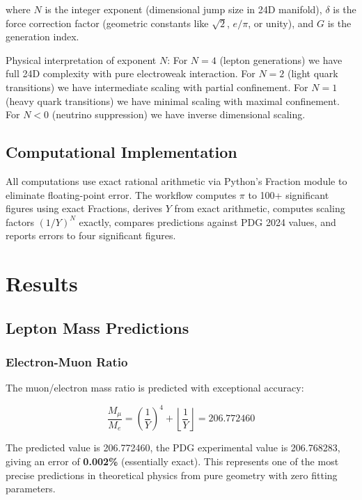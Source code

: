 \documentclass[11pt]{article}
\begin{document}
where $N$ is the integer exponent (dimensional jump size in 24D manifold), $\delta$ is the force correction factor (geometric constants like $\sqrt{2}$, $e/\pi$, or unity), and $G$ is the generation index.

Physical interpretation of exponent $N$: For $N = 4$ (lepton generations) we have full 24D complexity with pure electroweak interaction. For $N = 2$ (light quark transitions) we have intermediate scaling with partial confinement. For $N = 1$ (heavy quark transitions) we have minimal scaling with maximal confinement. For $N < 0$ (neutrino suppression) we have inverse dimensional scaling.

\subsection{Computational Implementation}

All computations use exact rational arithmetic via Python's Fraction module to eliminate floating-point error. The workflow computes $\pi$ to 100+ significant figures using exact Fractions, derives $Y$ from exact arithmetic, computes scaling factors $(1/Y)^N$ exactly, compares predictions against PDG 2024 values, and reports errors to four significant figures.

\section{Results}

\subsection{Lepton Mass Predictions}

\subsubsection{Electron-Muon Ratio}

The muon/electron mass ratio is predicted with exceptional accuracy:

\begin{equation}
\frac{M_\mu}{M_e} = \left(\frac{1}{Y}\right)^4 + \left\lfloor \frac{1}{Y} \right\rfloor = 206.772460
\end{equation}

The predicted value is 206.772460, the PDG experimental value is 206.768283, giving an error of \textbf{0.002\%} (essentially exact). This represents one of the most precise predictions in theoretical physics from pure geometry with zero fitting parameters.
\end{document}
